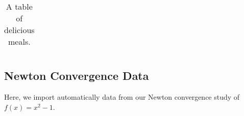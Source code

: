 \documentclass[12pt]{article}
\begin{document}
\begin{table}[h]
\begin{centering}
  \begin{tabular}{| l | c |}
   \hline 
     
   \hline
  \end{tabular}
  \caption{A table of delicious meals. \label{tab:1}}
  \end{centering}
\end{table}

\subsection{Newton Convergence Data}
Here, we import automatically data from our Newton convergence study of $f(x) = x^2 - 1$.


%
%
\end{document}
